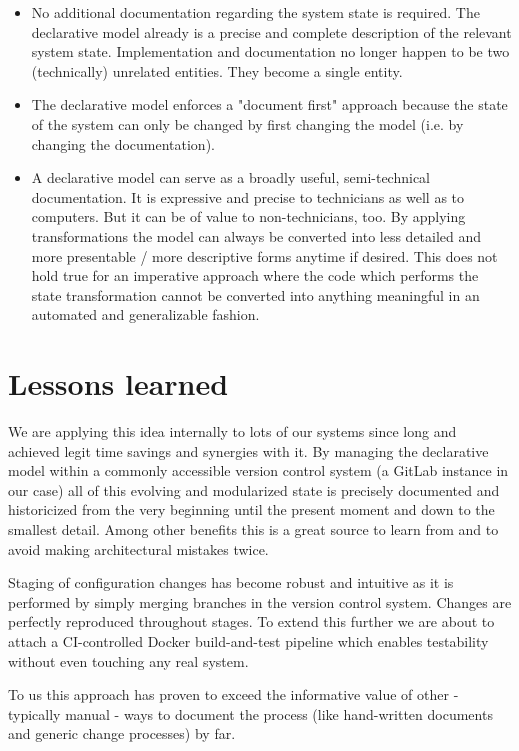 \documentclass[12pt, a4paper]{article}
\begin{document}
\begin{itemize}
  \item No additional documentation regarding the system state is required. The declarative model already is a precise and complete description of the relevant system state. Implementation and documentation no longer happen to be two (technically) unrelated entities. They become a single entity.

  \item The declarative model enforces a "document first" approach because the state of the system can only be changed by first changing the model (i.e. by changing the documentation).

  \item A declarative model can serve as a broadly useful, semi-technical documentation. It is expressive and precise to technicians as well as to computers. But it can be of value to non-technicians, too. By applying transformations the model can always be converted into less detailed and more presentable / more descriptive forms anytime if desired. This does not hold true for an imperative approach where the code which performs the state transformation cannot be converted into anything meaningful in an automated and generalizable fashion.
\end{itemize}

\section{Lessons learned}
We are applying this idea internally to lots of our systems since long and achieved legit time savings and synergies with it. By managing the declarative model within a commonly accessible version control system (a GitLab instance in our case) all of this evolving and modularized state is precisely documented and historicized from the very beginning until the present moment and down to the smallest detail. Among other benefits this is a great source to learn from and to avoid making architectural mistakes twice.

Staging of configuration changes has become robust and intuitive as it is performed by simply merging branches in the version control system. Changes are perfectly reproduced throughout stages. To extend this further we are about to attach a CI-controlled Docker build-and-test pipeline which enables testability without even touching any real system.

To us this approach has proven to exceed the informative value of other - typically manual - ways to document the process (like hand-written documents and generic change processes) by far.
\end{document}
